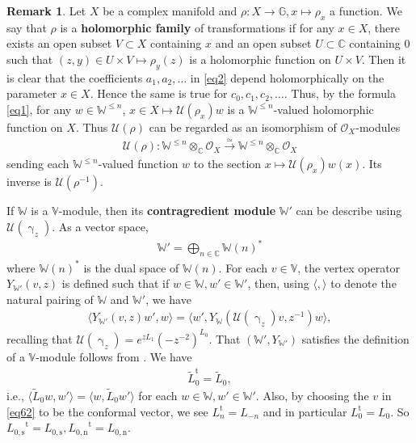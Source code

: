 \documentclass[11pt,b5paper,notitlepage]{article}
\theoremstyle{definition}
\newtheorem{rem}[df]{Remark}
\theoremstyle{plain}
\newcommand{\mc}{\mathcal}
\newcommand{\wtd}{\widetilde}
\newcommand{\tr}{\mathrm{t}} %
\newcommand{\bk}[1]{\langle {#1}\rangle}
\newcommand{\scr}{\mathscr}
\newcommand{\mbb}{\mathbb}
\newcommand{\Vbb}{\mathbb V}
\newcommand{\Wbb}{\mathbb W}
\newcommand{\Cbb}{\mathbb C}
\newcommand{\Lss}{{L_{0,\mathrm{s}}}}
\newcommand{\Lni}{{L_{0,\mathrm{n}}}}
\numberwithin{equation}{section}
\begin{document}
\begin{rem}\label{lb2}
Let $X$ be a complex manifold and $\rho:X\rightarrow\mbb G,x\mapsto \rho_x$ a function. We say that $\rho$ is a \textbf{holomorphic family} of transformations if for any $x\in X$, there exists an open subset $V\subset X$ containing $x$ and an open subset $U\subset\Cbb$ containing $0$ such that  $(z,y)\in U\times V\mapsto \rho_y(z)$ is a holomorphic function on $U\times V$. Then it is clear that the coefficients $a_1,a_2,\dots$ in \eqref{eq2} depend holomorphically on the parameter $x\in X$. Hence the same is true for $c_0,c_1,c_2,\dots$. Thus, by the formula \eqref{eq1}, for any $w\in\Wbb^{\leq n}$, $x\in X\mapsto \mc U(\rho_x)w$ is a $\Wbb^{\leq n}$-valued holomorphic function on $X$. Thus $\mc U(\rho)$ can be regarded as an isomorphism of  $\scr O_X$-modules 
\begin{align}
\mc U(\rho): \Wbb^{\leq n}\otimes_{\Cbb}\scr O_X\xrightarrow{\simeq}\Wbb^{\leq n}\otimes_{\Cbb}\scr O_X
\end{align}
sending each $\Wbb^{\leq n}$-valued function $w$ to the section $x\mapsto \mc U(\rho_x)w(x)$. \index{U@$\mc U(\rho)$} Its inverse is  $\mc U(\rho^{-1})$.
\end{rem}







If $\Wbb$ is a $\Vbb$-module, then its \textbf{contragredient module} $\Wbb'$ \index{W'@$\Wbb'$} can be describe using $\mc U(\upgamma_z)$. As a vector space,
\begin{align*}
\Wbb'=\bigoplus_{n\in\Cbb}\Wbb{(n)}^*
\end{align*}
where $\Wbb{(n)}^*$ is the dual space of $\Wbb{(n)}$. For each $v\in\Vbb$, the vertex operator $Y_{\Wbb'}(v,z)$ is defined such that if $w\in\Wbb,w'\in\Wbb'$, then, using $\bk{,}$ to denote the natural pairing of $\Wbb$ and $\Wbb'$, we have 
\begin{align}
\bk{Y_{\Wbb'}(v,z)w',w}=\bk{w',Y_\Wbb(\mc U(\upgamma_z)v,z^{-1})w},\label{eq62}
\end{align}
recalling that $\mc U(\upgamma_z)=e^{zL_1}(-z^{-2})^{L_0}$. That  $(\Wbb',Y_{\Wbb'})$ satisfies the definition of a $\Vbb$-module follows from \cite{FHL93}. We have 
\begin{align}
	\wtd L_0^\tr=\wtd L_0,\label{eq99}
\end{align}
i.e., $\bk{\wtd L_0w,w'}=\bk{w,\wtd L_0w'}$ for each $w\in\Wbb,w'\in\Wbb'$. Also, by choosing the $v$ in \eqref{eq62} to be the conformal vector, we see $L_n^\tr=L_{-n}$ and in particular $L_0^\tr=L_0$. So $\Lss^\tr=\Lss,\Lni^\tr=\Lni$.
\end{document}
